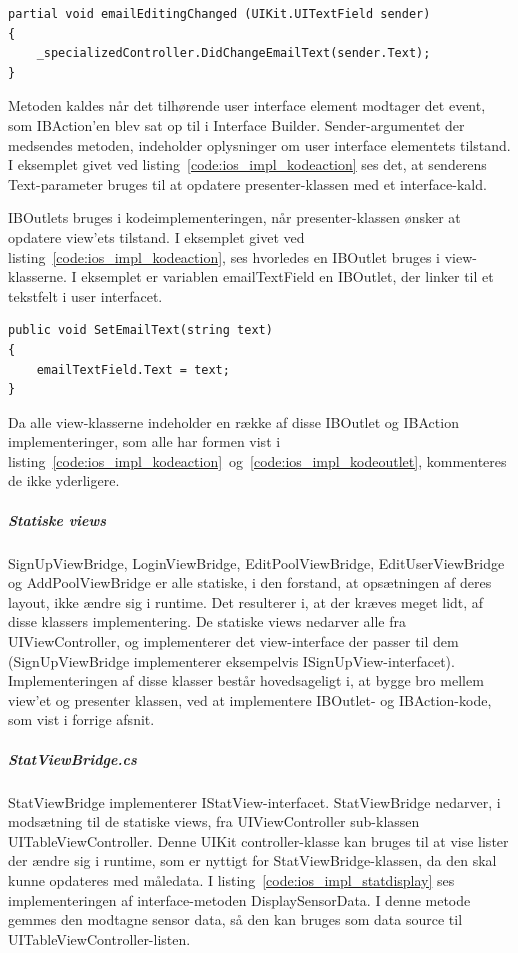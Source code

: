 \begin{lstlisting}[caption={Kodeimplementering af en IBAction},label={code:ios_impl_kodeaction}]
partial void emailEditingChanged (UIKit.UITextField sender)
{
	_specializedController.DidChangeEmailText(sender.Text);
}
\end{lstlisting}

Metoden kaldes når det tilhørende user interface element modtager det event, som IBAction'en blev sat op til i Interface Builder. Sender-argumentet der medsendes metoden, indeholder oplysninger om user interface elementets tilstand. I eksemplet givet ved listing~\ref{code:ios_impl_kodeaction} ses det, at senderens Text-parameter bruges til at opdatere presenter-klassen med et interface-kald.

IBOutlets bruges i kodeimplementeringen, når presenter-klassen ønsker at opdatere view'ets tilstand. I eksemplet givet ved listing~\ref{code:ios_impl_kodeaction}, ses hvorledes en IBOutlet bruges i view-klasserne. I eksemplet er variablen emailTextField en IBOutlet, der linker til et tekstfelt i user interfacet.

\begin{lstlisting}[caption={Brug af en IBOutlet i koden},label={code:ios_impl_kodeoutlet}]
public void SetEmailText(string text)
{
	emailTextField.Text = text;
}
\end{lstlisting}

Da alle view-klasserne indeholder en række af disse IBOutlet og IBAction implementeringer, som alle har formen vist i listing~\ref{code:ios_impl_kodeaction}~og~\ref{code:ios_impl_kodeoutlet}, kommenteres de ikke yderligere.

\subparagraph{Statiske views}
SignUpViewBridge, LoginViewBridge, EditPoolViewBridge, EditUserViewBridge og AddPoolViewBridge er alle statiske, i den forstand, at opsætningen af deres layout, ikke ændre sig i runtime. Det resulterer i, at der kræves meget lidt, af disse klassers implementering. De statiske views nedarver alle fra UIViewController, og implementerer det view-interface der passer til dem (SignUpViewBridge implementerer eksempelvis ISignUpView-interfacet). Implementeringen af disse klasser består hovedsageligt i, at bygge bro mellem view'et og presenter klassen, ved at implementere IBOutlet- og IBAction-kode, som vist i forrige afsnit. 

\subparagraph{StatViewBridge.cs}
StatViewBridge implementerer IStatView-interfacet. StatViewBridge nedarver, i modsætning til de statiske views, fra UIViewController sub-klassen UITableViewController. Denne UIKit controller-klasse kan bruges til at vise lister der ændre sig i runtime, som er nyttigt for StatViewBridge-klassen, da den skal kunne opdateres med måledata. I listing~\ref{code:ios_impl_statdisplay} ses implementeringen af interface-metoden DisplaySensorData. I denne metode gemmes den modtagne sensor data, så den kan bruges som data source til UITableViewController-listen.

